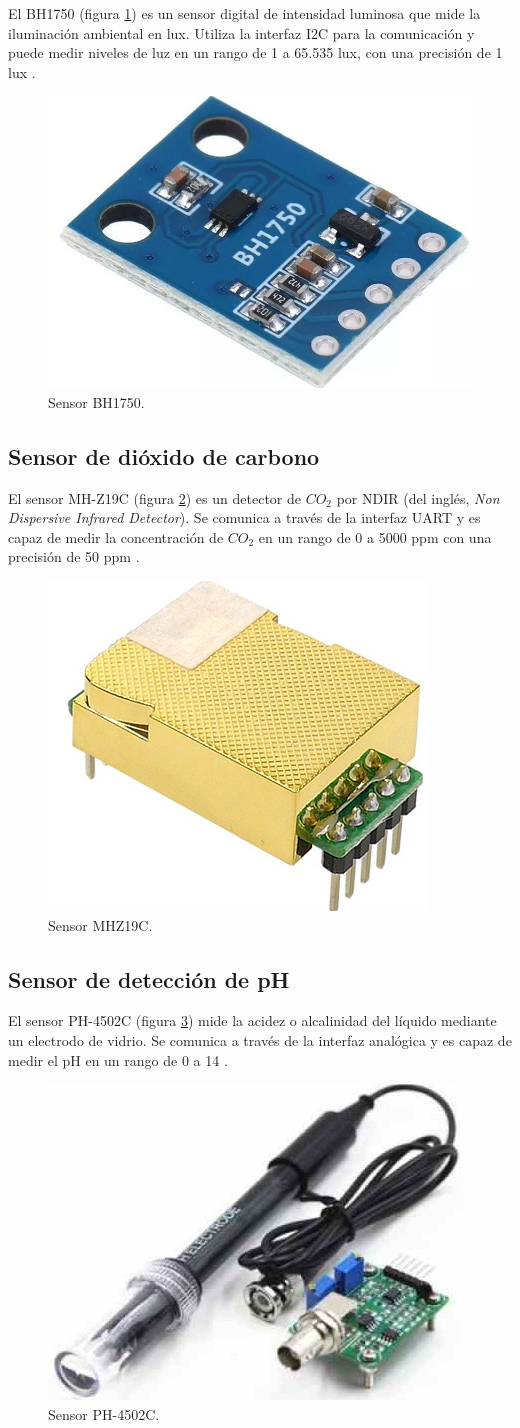 El BH1750 (figura \ref{fig:BH1750}) es un sensor digital de intensidad luminosa
que mide la iluminación ambiental en lux. Utiliza la interfaz I2C para la
comunicación y puede medir niveles de luz en un rango de 1 a 65.535 lux, con
una precisión de 1 lux \cite{ROHM_BH1750}.

\begin{figure}[H]
	\centering
	\includegraphics[height=.15\textwidth]{./Images/5.png}
	\caption{Sensor BH1750.}
	\label{fig:BH1750}
\end{figure}

\subsection{Sensor de dióxido de carbono}

El sensor MH-Z19C (figura \ref{fig:MHZ19C}) es un detector de $CO_2$ por NDIR
(del inglés, \textit{Non Dispersive Infrared Detector}). Se comunica a través
de la interfaz UART y es capaz de medir la concentración de $CO_2$ en un rango
de 0 a 5000 ppm con una precisión de 50 ppm \cite{WINSEN_MHZ19C}.

\begin{figure}[H]
	\centering
	\includegraphics[height=.15\textwidth]{./Images/6.png}
	\caption{Sensor MHZ19C.}
	\label{fig:MHZ19C}
\end{figure}

\subsection{Sensor de detección de pH}

El sensor PH-4502C (figura \ref{fig:PH4502C}) mide la acidez o alcalinidad del
líquido mediante un electrodo de vidrio. Se comunica a través de la interfaz
analógica y es capaz de medir el pH en un rango de 0 a 14 \cite{PH-4502C}.

\begin{figure}[H]
	\centering
	\includegraphics[height=.15\textwidth]{./Images/7.png}
	\caption{Sensor PH-4502C.}
	\label{fig:PH4502C}
\end{figure}

